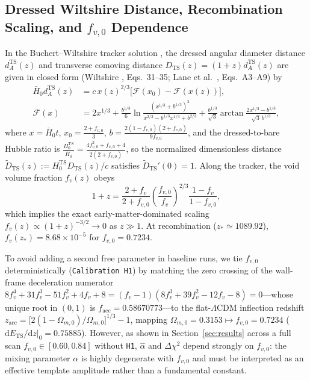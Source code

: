 \documentclass[11pt,a4paper]{article}
\begin{document}
\subsection{Dressed Wiltshire Distance, Recombination Scaling, and $f_{v,0}$ Dependence}
In the Buchert--Wiltshire tracker solution \cite{Wiltshire2009PRD,LaneWiltshire2025MNRAS}, the dressed angular diameter distance $d_A^{\mathrm{TS}}(z)$ and transverse comoving distance $D_{\mathrm{TS}}(z) = (1+z)d_A^{\mathrm{TS}}(z)$ are given in closed form (Wiltshire \cite{Wiltshire2009PRD}, Eqs.~31--35; Lane et al.\ \cite{LaneWiltshire2025MNRAS}, Eqs.~A3--A9) by
\begin{equation}
\begin{split}
    \bar{H}_0 d_A^{\mathrm{TS}}(z) &= c\,x(z)^{2/3}\bigl[\mathcal{F}(x_0) - \mathcal{F}(x(z))\bigr], \\
    \mathcal{F}(x) &= 2x^{1/3} + \frac{b^{1/3}}{6}\ln\frac{(x^{1/3}+b^{1/3})^2}{x^{2/3}-b^{1/3}x^{1/3}+b^{2/3}} + \frac{b^{1/3}}{\sqrt{3}}\arctan\frac{2x^{1/3}-b^{1/3}}{\sqrt{3}\,b^{1/3}},
\end{split}
\label{eq:wiltshire-exact}
\end{equation}
where $x = \bar{H}_0 t$, $x_0 = \frac{2+f_{v,0}}{3}$, $b = \frac{2(1-f_{v,0})(2+f_{v,0})}{9f_{v,0}}$, and the dressed-to-bare Hubble ratio is $\frac{H_0^{\mathrm{TS}}}{\bar{H}_0} = \frac{4f_{v,0}^2 + f_{v,0} + 4}{2(2+f_{v,0})}$, so the normalized dimensionless distance $\widetilde{D}_{\mathrm{TS}}(z) := H_0^{\mathrm{TS}}D_{\mathrm{TS}}(z)/c$ satisfies $\widetilde{D}_{\mathrm{TS}}'(0) = 1$. Along the tracker, the void volume fraction $f_v(z)$ obeys
\begin{equation}
    1 + z = \frac{2 + f_v}{2 + f_{v,0}}\left(\frac{f_{v,0}}{f_v}\right)^{\!2/3}\frac{1 - f_v}{1 - f_{v,0}},
    \label{eq:tracker-z-fv}
\end{equation}
which implies the exact early-matter-dominated scaling $f_v(z) \propto (1+z)^{-3/2} \to 0$ as $z \gg 1$. At recombination ($z_* \simeq 1089.92$), $f_v(z_*) = 8.68\times 10^{-5}$ for $f_{v,0} = 0.7234$.

To avoid adding a second free parameter in baseline runs, we tie $f_{v,0}$ deterministically (\texttt{Calibration H1}) by matching the zero crossing of the wall-frame deceleration numerator $8f_v^4 + 31f_v^3 - 51f_v^2 + 4f_v + 8 = (f_v - 1)(8f_v^3 + 39f_v^2 - 12f_v - 8) = 0$---whose unique root in $(0, 1)$ is $f_{\mathrm{acc}} = 0.58670773$---to the flat-$\Lambda$CDM inflection redshift $z_{\mathrm{acc}} = \bigl[2(1-\Omega_{m,0})/\Omega_{m,0}\bigr]^{1/3} - 1$, mapping $\Omega_{m,0} = 0.3153 \mapsto f_{v,0} = 0.7234$ ($\left.\mathrm{d}E_{\mathrm{TS}}/\mathrm{d}z\right|_0 = 0.75885$). However, as shown in Section~\ref{sec:results} across a full scan $f_{v,0} \in [0.60, 0.84]$ without \texttt{H1}, $\hat{\alpha}$ and $\Delta\chi^2$ depend strongly on $f_{v,0}$: the mixing parameter $\alpha$ is highly degenerate with $f_{v,0}$ and must be interpreted as an effective template amplitude rather than a fundamental constant.
\end{document}
